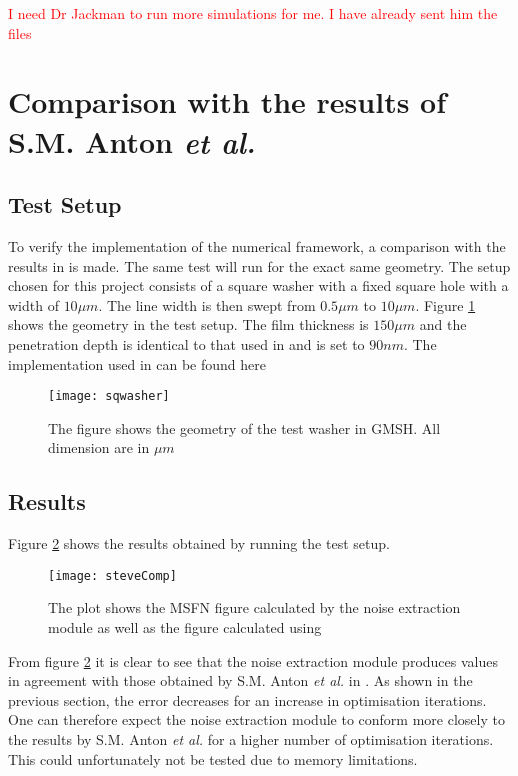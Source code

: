 \textcolor{red}{I need Dr Jackman to run more simulations for me. I have already sent him the files}

\section{Comparison with the results of S.M. Anton \textit{et al.}}
\subsection{Test Setup}
To verify the implementation of the numerical framework, a comparison with the results in \cite{fluxNoiseSquidsStevenAnton} is made. The same test will run for the exact same geometry. The setup chosen for this project consists of a square washer with a fixed square hole with a width of $10 \mu m$. The line width is then swept from $0.5 \mu m$ to $10 \mu m$. Figure \ref{fig:sqwasher} shows the geometry in the test setup. The film thickness is $150 \mu m$ and the penetration depth is identical to that used in \cite{fluxNoiseSquidsStevenAnton} and is set to $90 nm$. The implementation used in \cite{fluxNoiseSquidsStevenAnton} can be found here \cite{msfnCode} 

\begin{figure}[H]
    \centering
    \texttt{[image: sqwasher]}
    \caption{The figure shows the geometry of the test washer in GMSH. All dimension are in $\mu m$}
    \label{fig:sqwasher}
\end{figure}

\subsection{Results}
Figure \ref{fig:steveComp} shows the results obtained by running the test setup. 
\begin{figure}[H]

    \centering
    \texttt{[image: steveComp]}
    \caption{The plot shows the MSFN figure calculated by the noise extraction module as well as the figure calculated using \cite{msfnCode}}
    \label{fig:steveComp}
\end{figure}
From figure \ref{fig:steveComp} it is clear to see that the noise extraction module produces values in agreement with those obtained by S.M. Anton \textit{et al.} in \cite{fluxNoiseSquidsStevenAnton}. As shown in the previous section, the error decreases for an increase in optimisation iterations. One can therefore expect the noise extraction module to conform more closely to the results by S.M. Anton \textit{et al.} for a higher number of optimisation iterations. This could unfortunately not be tested due to memory limitations.

